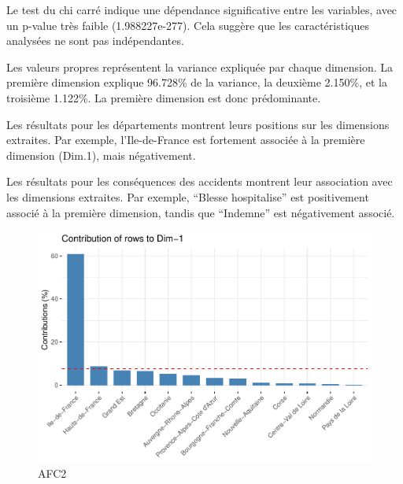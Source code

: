 \documentclass[french,]{compterendu}
\theoremstyle{urcastyle}
\theoremstyle{remark}
\begin{document}
Le test du chi carré indique une dépendance significative entre les variables, avec un p-value très faible (1.988227e-277). Cela suggère que les caractéristiques analysées ne sont pas indépendantes.

Les valeurs propres représentent la variance expliquée par chaque dimension. La première dimension explique 96.728\% de la variance, la deuxième 2.150\%, et la troisième 1.122\%. La première dimension est donc prédominante.

Les résultats pour les départements montrent leurs positions sur les dimensions extraites. Par exemple, l'Ile-de-France est fortement associée à la première dimension (Dim.1), mais négativement.

Les résultats pour les conséquences des accidents montrent leur association avec les dimensions extraites. Par exemple, ``Blesse hospitalise'' est positivement associé à la première dimension, tandis que ``Indemne'' est négativement associé.

\begin{figure}[H]

{\centering \includegraphics[width=0.9\linewidth]{Rapport_ADD_LEO-GABET_files/figure-latex/afc2-1} 

}

\caption{AFC2}\label{fig:afc2}
\end{figure}
\end{document}
